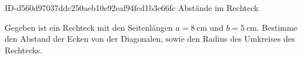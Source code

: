 \begin{exercise}
      {ID-d560d97037ddc250aeb10e92eaf94fcd1b3e66fc}
      {Abstände im Rechteck}
  \ifproblem\problem\par
    Gegeben ist ein Rechteck mit den Seitenlängen
    $a=\SI{8}{\centi\metre}$ und
    $b=\SI{5}{\centi\metre}$.
    Bestimme den Abstand der Ecken von der Diagonalen,
    sowie den Radius des Umkreises des Rechtecks.
  \fi
\end{exercise}
